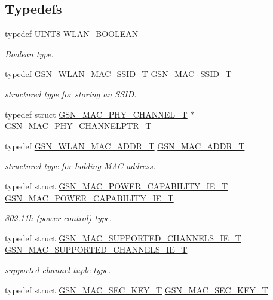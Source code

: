 \subsection*{Typedefs}
\begin{DoxyCompactItemize}
\item 
typedef \hyperlink{a00660_gab27e9918b538ce9d8ca692479b375b6a}{UINT8} \hyperlink{a00642_ga7fb691c78d3a1046fa998bae1560e1a5}{WLAN\_\-BOOLEAN}
\begin{DoxyCompactList}\small\item\em Boolean type. \end{DoxyCompactList}\item 
typedef \hyperlink{a00417}{GSN\_\-WLAN\_\-MAC\_\-SSID\_\-T} \hyperlink{a00642_gaa99e8c0b151cd3a4b954dda1b8d45170}{GSN\_\-MAC\_\-SSID\_\-T}
\begin{DoxyCompactList}\small\item\em structured type for storing an SSID. \end{DoxyCompactList}\item 
typedef struct \hyperlink{a00118}{GSN\_\-MAC\_\-PHY\_\-CHANNEL\_\-T} $\ast$ \hyperlink{a00522_a09016ea9c6e5a2b13064da85e1b4b5ba}{GSN\_\-MAC\_\-PHY\_\-CHANNELPTR\_\-T}
\item 
typedef \hyperlink{a00416}{GSN\_\-WLAN\_\-MAC\_\-ADDR\_\-T} \hyperlink{a00642_ga1150dbb5bc1f1413f5de4acf75c48815}{GSN\_\-MAC\_\-ADDR\_\-T}
\begin{DoxyCompactList}\small\item\em structured type for holding MAC address. \end{DoxyCompactList}\item 
typedef struct \hyperlink{a00122}{GSN\_\-MAC\_\-POWER\_\-CAPABILITY\_\-IE\_\-T} \hyperlink{a00642_ga7dca958f849da86237513f7adc55ed53}{GSN\_\-MAC\_\-POWER\_\-CAPABILITY\_\-IE\_\-T}
\begin{DoxyCompactList}\small\item\em 802.11h (power control) type. \end{DoxyCompactList}\item 
typedef struct \hyperlink{a00133}{GSN\_\-MAC\_\-SUPPORTED\_\-CHANNELS\_\-IE\_\-T} \hyperlink{a00642_ga0e3372dcd5ddb7b5c77b4d1d132cd8c4}{GSN\_\-MAC\_\-SUPPORTED\_\-CHANNELS\_\-IE\_\-T}
\begin{DoxyCompactList}\small\item\em supported channel tuple type. \end{DoxyCompactList}\item 
typedef struct \hyperlink{a00131}{GSN\_\-MAC\_\-SEC\_\-KEY\_\-T} \hyperlink{a00642_ga47d838a4f5db3c6d8039dac8b4726479}{GSN\_\-MAC\_\-SEC\_\-KEY\_\-T}

\end{DoxyCompactItemize}
